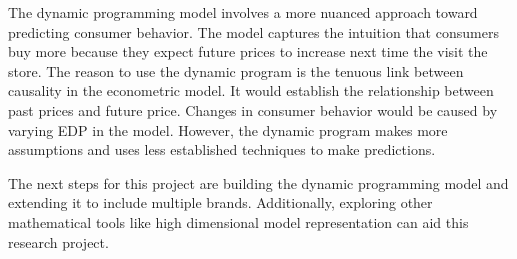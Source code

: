 \documentclass{article}
\begin{document}
The dynamic programming model involves a more nuanced approach toward predicting consumer behavior. The model captures the intuition that consumers buy more because they expect future prices to increase next time the visit the store. The reason to use the dynamic program is the tenuous link between causality in the econometric model. It would establish the relationship between past prices and future price. Changes in consumer behavior would be caused by varying EDP in the model. However, the dynamic program makes more assumptions and uses less established techniques to make predictions.

The next steps for this project are building the dynamic programming model and extending it to include multiple brands. Additionally, exploring other mathematical tools like high dimensional model representation can aid this research project. 

\pagebreak

{}


\pagebreak
\end{document}
